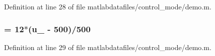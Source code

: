 Definition at line 28 of file matlabdatafiles/control\_\-mode/demo.m.
\subsubsection[{u\_\-3}]{ = 12$\ast$({\bf u\_} -\/ 500)/500}\label{matlabdatafiles_2control__mode_2demo_8m_a9ab9ff12ff95c55341941011872c456a}


Definition at line 29 of file matlabdatafiles/control\_\-mode/demo.m.